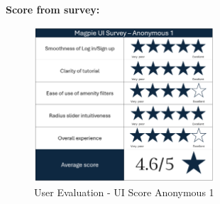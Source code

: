 \noindent\textbf{Score from survey: }
\begin{figure}[h!]
    \centering
    \includegraphics[width=0.6\textwidth]{images/survey-maira.png}
    \caption{User Evaluation - UI Score Anonymous 1}
\end{figure}

\newpage

